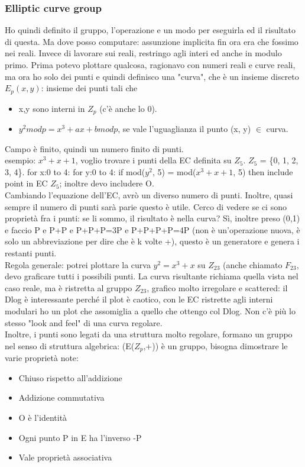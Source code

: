 \documentclass[16px]{article}
\begin{document}
\subsubsection{Elliptic curve group}
Ho quindi definito il gruppo, l'operazione e un modo per eseguirla ed il risultato di questa. Ma dove posso computare: assunzione implicita fin ora era che fossimo nei reali. Invece di lavorare sui reali, restringo agli interi ed anche in modulo primo. Prima potevo plottare qualcosa, ragionavo con numeri reali e curve reali, ma ora ho solo dei punti e quindi definisco una "curva", che è un insieme discreto $E_p(x, y)$: insieme dei punti tali che
\begin{itemize}
\item x,y sono interni in $Z_p$ (c'è anche lo 0).
\item $y^2modp = x^3 + ax +b modp$, se vale l'uguaglianza il punto (x, y) $\in$ curva.
\end{itemize}
Campo è finito, quindi un numero finito di punti.\\ esempio: $x^3+x+1$, voglio trovare i punti della EC definita su $Z_5$. $Z_5$ = \{0, 1, 2, 3, 4\}. for x:0 to 4: for y:0 to 4: if mod($y^2$, 5) = mod($x^3 + x + 1$, 5) then include point in EC $Z_5$; inoltre devo includere O.\\ Cambiando l'equazione dell'EC, avrò un diverso numero di punti. Inoltre, quasi sempre il numero di punti sarà parie questo è utile. Cerco di vedere se ci sono proprietà fra i punti: se li sommo, il risultato è nella curva? Sì, inoltre preso (0,1) e faccio P e P+P e P+P+P=3P e P+P+P+P=4P (non è un'operazione nuova, è solo un abbreviazione per dire che è k volte +), questo è un generatore e genera i restanti punti.\\ Regola generale: potrei plottare la curva $y^2 = x^3 + x$ su $Z_{23}$ (anche chiamato $F_{23}$, devo graficare tutti i possibili punti. La curva risultante richiama quella vista nel caso reale, ma è ristretta al gruppo $Z_{23}$, grafico molto irregolare e scattered: il Dlog è interessante perché il plot è caotico, con le EC ristrette agli interni modulari ho un plot che assomiglia a quello che ottengo col Dlog. Non c'è più lo stesso "look and feel" di una curva regolare.\\ Inoltre, i punti sono legati da una struttura molto regolare, formano un gruppo nel senso di struttura algebrica: (E($Z_p$,+)) è un gruppo, bisogna dimostrare le varie proprietà note:
\begin{itemize}
\item Chiuso rispetto all'addizione 
\item Addizione commutativa
\item O è l'identità
\item Ogni punto P in E ha l'inverso -P
\item Vale proprietà associativa
\end{itemize}
\end{document}
